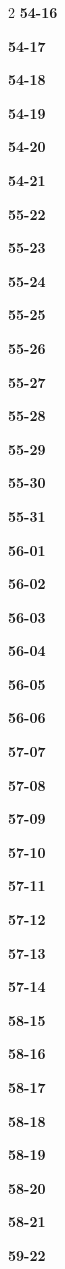 \documentclass[10pt,a4paper]{article}
\begin{document}
\begin{multicols}{2}
\noindent\textbf{54-16}\ \par
\noindent\textbf{54-17}\ \par
\noindent\textbf{54-18}\ \par
\noindent\textbf{54-19}\ \par
\noindent\textbf{54-20}\ \par
\noindent\textbf{54-21}\ \par
\noindent\textbf{55-22}\ \par
\noindent\textbf{55-23}\ \par
\noindent\textbf{55-24}\ \par
\noindent\textbf{55-25}\ \par
\noindent\textbf{55-26}\ \par
\noindent\textbf{55-27}\ \par
\noindent\textbf{55-28}\ \par
\noindent\textbf{55-29}\ \par
\noindent\textbf{55-30}\ \par
\noindent\textbf{55-31}\ \par
\noindent\textbf{56-01}\ \par
\noindent\textbf{56-02}\ \par
\noindent\textbf{56-03}\ \par
\noindent\textbf{56-04}\ \par
\noindent\textbf{56-05}\ \par
\noindent\textbf{56-06}\ \par
\noindent\textbf{57-07}\ \par
\noindent\textbf{57-08}\ \par
\noindent\textbf{57-09}\ \par
\noindent\textbf{57-10}\ \par
\noindent\textbf{57-11}\ \par
\noindent\textbf{57-12}\ \par
\noindent\textbf{57-13}\ \par
\noindent\textbf{57-14}\ \par
\noindent\textbf{58-15}\ \par
\noindent\textbf{58-16}\ \par
\noindent\textbf{58-17}\ \par
\noindent\textbf{58-18}\ \par
\noindent\textbf{58-19}\ \par
\noindent\textbf{58-20}\ \par
\noindent\textbf{58-21}\ \par
\noindent\textbf{59-22}\ \par

\end{multicols}
\end{document}
